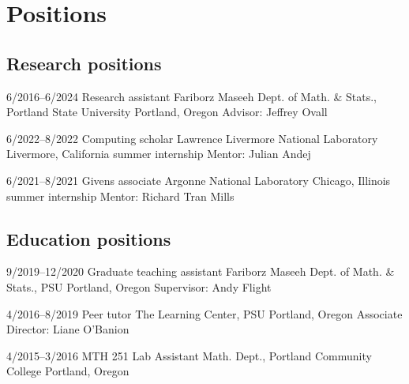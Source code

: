 \section{Positions}

\subsection{Research positions}

    \cventry
    {6/2016--6/2024}
    {Research assistant}
    {Fariborz Maseeh Dept. of Math. \& Stats., Portland State University}
    {Portland, Oregon}
    {}
    {Advisor: Jeffrey Ovall}

    \cventry
    {6/2022--8/2022}
    {Computing scholar}
    {Lawrence Livermore National Laboratory}
    {Livermore, California}
    {summer internship}
    {Mentor: Julian Andej}

    \cventry
    {6/2021--8/2021}
    {Givens associate}
    {Argonne National Laboratory}
    {Chicago, Illinois}
    {summer internship}
    {Mentor: Richard Tran Mills}

\subsection{Education positions}

    \cventry
    {9/2019--12/2020}
    {Graduate teaching assistant}
    {Fariborz Maseeh Dept. of Math. \& Stats., PSU}
    {Portland, Oregon}
    {}
    {Supervisor: Andy Flight}

    \cventry
    {4/2016--8/2019}
    {Peer tutor}
    {The Learning Center, PSU}
    {Portland, Oregon}
    {}
    {Associate Director: Liane O'Banion}

    \cventry
    {4/2015--3/2016}
    {MTH 251 Lab Assistant}
    {Math. Dept., Portland Community College}
    {Portland, Oregon}
    {}
    {}

